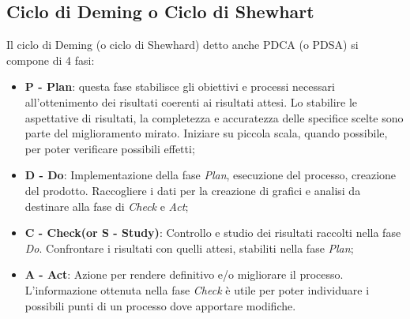   \subsection{Ciclo di Deming o Ciclo di Shewhart}
  Il ciclo di Deming (o ciclo di Shewhard) detto anche PDCA (o PDSA) si compone di 4 fasi:
  \begin{itemize}
    \item \textbf{P - Plan}: questa fase stabilisce gli obiettivi e processi necessari all'ottenimento dei risultati coerenti ai risultati attesi.
    Lo stabilire le aspettative di risultati, la completezza e accuratezza delle specifice scelte sono parte del miglioramento mirato.
    Iniziare su piccola scala, quando possibile, per poter verificare possibili effetti;
    \item \textbf{D - Do}: Implementazione della fase \emph{Plan}, esecuzione del processo, creazione del prodotto.
    Raccogliere i dati per la creazione di grafici e analisi da destinare alla fase di \emph{Check} e \emph{Act};
    \item \textbf{C - Check(or S - Study)}: Controllo e studio dei risultati raccolti nella fase \emph{Do}. Confrontare i risultati con quelli attesi, stabiliti nella fase \emph{Plan};
    \item \textbf{A - Act}: Azione per rendere definitivo e/o migliorare il processo. L'informazione ottenuta nella fase \emph{Check} è utile per poter individuare i possibili punti di un processo dove apportare modifiche.
  \end{itemize}
